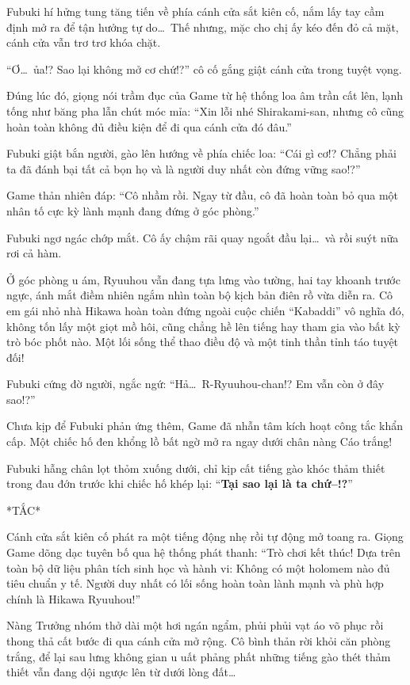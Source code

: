 \documentclass[../main.tex]{subfiles}
\begin{document}
Fubuki hí hửng tung tăng tiến về phía cánh cửa sắt kiên cố, nắm lấy tay cầm định mở ra để tận hưởng tự do\dots\ Thế nhưng, mặc cho chị ấy kéo đến đỏ cả mặt, cánh cửa vẫn trơ trơ khóa chặt.

``Ơ\dots\ ủa!? Sao lại không mở cơ chứ!?'' cô cố gắng giật cánh cửa trong tuyệt vọng.

Đúng lúc đó, giọng nói trầm đục của Game từ hệ thống loa âm trần cất lên, lạnh tống như băng pha lẫn chút móc mỉa: ``Xin lỗi nhé Shirakami-san, nhưng cô cũng hoàn toàn không đủ điều kiện để đi qua cánh cửa đó đâu.''

Fubuki giật bắn người, gào lên hướng về phía chiếc loa: ``Cái gì cơ!? Chẳng phải ta đã đánh bại tất cả bọn họ và là người duy nhất còn đứng vững sao!?''

Game thản nhiên đáp: ``Cô nhầm rồi. Ngay từ đầu, cô đã hoàn toàn bỏ qua một nhân tố cực kỳ lành mạnh đang đứng ở góc phòng.''

Fubuki ngơ ngác chớp mắt. Cô ấy chậm rãi quay ngoắt đầu lại\dots\ và rồi suýt nữa rơi cả hàm.

Ở góc phòng u ám, Ryuuhou vẫn đang tựa lưng vào tường, hai tay khoanh trước ngực, ánh mắt điềm nhiên ngắm nhìn toàn bộ kịch bản điên rồ vừa diễn ra. Cô em gái nhỏ nhà Hikawa hoàn toàn đứng ngoài cuộc chiến ``Kabaddi'' vô nghĩa đó, không tốn lấy một giọt mồ hôi, cũng chẳng hề lên tiếng hay tham gia vào bất kỳ trò bóc phốt nào. Một lối sống thể thao điều độ và một tinh thần tỉnh táo tuyệt đối!

Fubuki cứng đờ người, ngắc ngứ: ``Hả\dots\ R-Ryuuhou-chan!? Em vẫn còn ở đây sao!?''

Chưa kịp để Fubuki phản ứng thêm, Game đã nhẫn tâm kích hoạt công tắc khẩn cấp. Một chiếc hố đen khổng lồ bất ngờ mở ra ngay dưới chân nàng Cáo trắng!

Fubuki hẫng chân lọt thỏm xuống dưới, chỉ kịp cất tiếng gào khóc thảm thiết trong đau đớn trước khi chiếc hố khép lại: ``\textbf{Tại sao lại là ta chứ--!?}''

*TẮC*

Cánh cửa sắt kiên cố phát ra một tiếng động nhẹ rồi tự động mở toang ra. Giọng Game dõng dạc tuyên bố qua hệ thống phát thanh: ``Trò chơi kết thúc! Dựa trên toàn bộ dữ liệu phân tích sinh học và hành vi: Không có một holomem nào đủ tiêu chuẩn y tế. Người duy nhất có lối sống hoàn toàn lành mạnh và phù hợp chính là Hikawa Ryuuhou!''

Nàng Trưởng nhóm thở dài một hơi ngán ngẩm, phủi phủi vạt áo võ phục rồi thong thả cất bước đi qua cánh cửa mở rộng. Cô bình thản rời khỏi căn phòng trắng, để lại sau lưng không gian u uất phảng phất những tiếng gào thét thảm thiết vẫn đang dội ngược lên từ dưới lòng đất\dots
\end{document}
